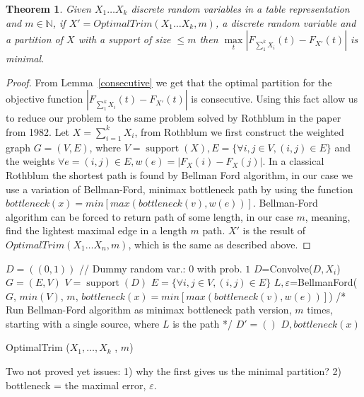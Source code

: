 \documentclass[review]{elsarticle}
\newtheorem{theorem}{Theorem}
\DeclareMathOperator{\support}{support}
\begin{document}
\begin{theorem}
Given $X_1 \dots X_k$ discrete random variables in a table representation and $m \in \mathbb{N}$, if $X'=OptimalTrim(X_1 \dots X_k,m)$, a discrete random variable and a partition of $X$ with a support of size $\leq m$ then $\max\limits_{t}|F_{\sum_1^k X_i}(t)-F_{X'}(t)|$ is minimal.
\end{theorem}

\begin{proof}
From Lemma~\ref{consecutive} we get that the optimal partition for the objective function $|F_{\sum_1^k X_i}(t)-F_{X'}(t)|$ is consecutive.
Using this fact allow us to reduce our problem to the same problem solved by Rothblum in the paper from 1982. Let $X = \sum_{i=1}^k X_i$, from Rothblum we first construct the weighted graph $G = (V,E)$, where $V = \support(X), E = \{\forall i,j \in V, (i,j)\in E\}$ and the weights $\forall e=(i,j)\in E, w(e) = |F_{X}(i)-F_{X}(j)|$. In a classical Rothblum the shortest path is found by Bellman Ford algorithm, in our case we use a variation of Bellman-Ford, minimax bottleneck path by using the function $bottleneck(x) =    min   [max(bottleneck(v),w(e))]$. Bellman-Ford algorithm can be forced to return path of some length, in our case $m$, meaning, find the lightest maximal edge in a length $m$ path. 
$X'$ is the result of $OptimalTrim(X_1 \dots X_n,m)$, which is the same as described above. 
\end{proof}

\begin{algorithm}
  \DontPrintSemicolon

   $D=((0,1))$ //  Dummy random var.: $0$ with prob. $1$ \;
   {
	$D$=Convolve($D, X_i$)\; 
	}
   $G=(E,V)$ \;
   $V = \support(D)$\;
   $E = \{\forall i,j \in V, (i,j)\in E\}$\;
   $L, \varepsilon$=BellmanFord($G$, $min(V)$, $m$, $bottleneck(x) =    min   [max(bottleneck(v),w(e))]$) /* Run Bellman-Ford algorithm as minimax bottleneck path version, $m$ times, starting with a single source, where $L$ is the path */ \;
   $D'=()$\;
   \Return $D, bottleneck(x)$\;
     
\caption{OptimalTrim ($X_1,\dots,X_k$ , $m$)}  
\label{alg:sequence}
\end{algorithm}


Two not proved yet issues:
1) why the first gives us the minimal partition? 2) bottleneck  = the maximal error, $\varepsilon$.
\end{document}
